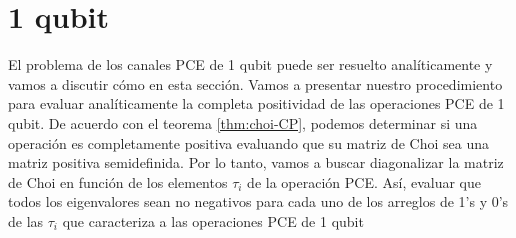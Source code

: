 \section{1 qubit} %
%

El problema de los canales PCE de 1 qubit puede ser resuelto analíticamente
y vamos a discutir cómo en esta sección. 
Vamos a presentar nuestro procedimiento para evaluar analíticamente 
la completa positividad de las operaciones PCE de 1 qubit.
De acuerdo con el teorema \ref{thm:choi-CP}, podemos determinar si
una operación es completamente positiva evaluando que su 
matriz de Choi sea una matriz positiva semidefinida.
Por lo tanto, vamos a buscar diagonalizar la matriz de Choi en 
función de los elementos $\tau_i$ de la operación PCE. Así, evaluar
que todos los eigenvalores sean no negativos para 
cada uno de los arreglos de 1's y 0's de las $\tau_i$ que 
caracteriza a las operaciones PCE de 1 qubit 

